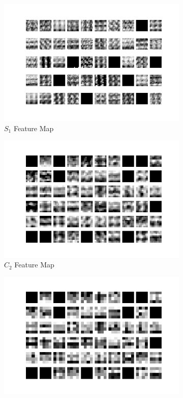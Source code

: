 \begin{figure}[H]
\begin{subfigure}{0.5\textwidth}
        \includegraphics[width=1\linewidth]{assets/plots1/q1a_pool1_0.png}
        \caption{$\textit{S}_1$ Feature Map}
    \end{subfigure}
    \begin{subfigure}{0.5\textwidth}
        \centering
        \includegraphics[width=1\linewidth]{assets/plots1/q1a_conv2_0.png}
        \caption{$\textit{C}_2$ Feature Map}
    \end{subfigure}
    \begin{subfigure}{0.5\textwidth}
        \centering
        \includegraphics[width=1\linewidth]{assets/plots1/q1a_pool2_0.png}

\end{subfigure}
\end{figure}
